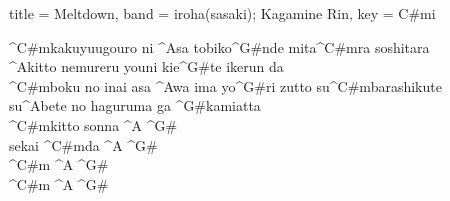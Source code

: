 \begin{song}[
	remember-chords = false ,
	verse/numbered = true ,
	transpose-capo = true 
	]{
		title = Meltdown,
		band = iroha(sasaki); Kagamine Rin,
		key  = C#mi
	}
\begin{chorus}
		^{C#m}kakuyuugouro ni ^{A}sa tobiko^{G#}nde mita^{C#m}ra soshitara
\\
		^{A}kitto nemureru youni kie^{G#}te ikerun da
\\
		^{C#m}boku no inai asa ^{A}wa ima yo^{G#}ri zutto su^{C#m}barashikute \\
		su^{A}bete no haguruma ga ^{G#}kamiatta
\\
		^{C#m}kitto sonna ^{A} ^{G#}
\\
		sekai ^{C#m}da ^{A} ^{G#} \\
		
		^{C#m} ^{A} ^{G#} \\
		^{C#m} ^{A} ^{G#} \\
		
	\end{chorus}
	
\end{song}